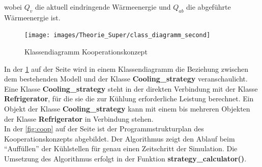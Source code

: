 wobei $Q_v$ die aktuell eindringende Wärmeenergie und $Q_{ab}$ die abgeführte
Wärmeenergie ist.

\begin{figure}[h!]
	\begin{center}
	\texttt{[image: images/Theorie\_Super/class\_diagramm\_second]}
	\end{center}
\caption{Klassendiagramm Kooperationskonzept}
\label{fig:klasskoop}
\end{figure}

In der \cref{fig:klasskoop} auf der Seite \pageref{fig:klasskoop} wird in einem
Klassendiagramm die Beziehung zwischen dem bestehenden Modell und der Klasse
\textbf{Cooling\_strategy} veranschaulicht. Eine Klasse
\textbf{Cooling\_strategy} steht in der direkten Verbindung mit der Klasse
\textbf{Refrigerator}, f\"ur die sie die zur K\"uhlung erforderliche Leistung
berechnet. Ein Objekt der Klasse \textbf{Cooling\_strategy} kann mit einem bis
mehreren Objekten der Klasse \textbf{Refrigerator} in Verbindung stehen.\\

In der \cref{fig:coop} auf der Seite \pageref{fig:coop} ist der
Programmstrukturplan des Kooperationskonzepts abgebildet. Der Algorithmus
zeigt den Ablauf beim "`Auff\"ullen"' der K\"uhlstellen  f\"ur genau einen
Zeitschritt der Simulation. Die Umsetzung des Algorithmus erfolgt
in der Funktion \textbf{strategy\_calculator()}.

